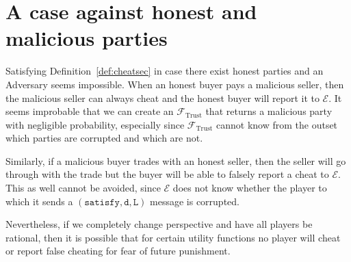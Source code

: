 \section{A case against honest and malicious parties}
  Satisfying Definition~\ref{def:cheatsec} in case there exist honest parties and an
  Adversary seems impossible. When an honest buyer pays a malicious seller, then the
  malicious seller can always cheat and the honest buyer will report it to $\mathcal{E}$.
  It seems improbable that we can create an $\mathcal{F}_{\mathrm{Trust}}$ that returns a
  malicious party with negligible probability, especially since
  $\mathcal{F}_{\mathrm{Trust}}$ cannot know from the outset which parties are corrupted
  and which are not.

  Similarly, if a malicious buyer trades with an honest seller, then the seller will go
  through with the trade but the buyer will be able to falsely report a cheat to
  $\mathcal{E}$. This as well cannot be avoided, since $\mathcal{E}$ does not know whether
  the player to which it sends a $\left(\mathtt{satisfy, d, L}\right)$ message is
  corrupted.

  Nevertheless, if we completely change perspective and have all players be rational, then
  it is possible that for certain utility functions no player will cheat or report false
  cheating for fear of future punishment.
